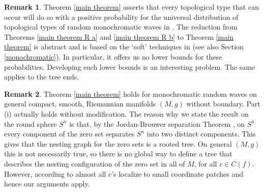 \documentclass[11pt,reqno]{amsart}
\theoremstyle{definition}
\newtheorem{remark}{Remark}
\begin{document}
\begin{remark} Theorem \ref{main theorem} asserts that every topological type that can occur will do so with a positive probability for the universal distribution of topological types of random monochromatic waves in \cite{SW}. The reduction from Theorems \ref{main theorem R a} and \ref{main theorem R b}  to  Theorem \ref{main theorem} is abstract and is based on the `soft' techniques in \cite{NS, SW} (see also Section \ref{monochromatic}). In particular, it offers us no lower bounds for these probabilities. Developing such lower bounds is an interesting problem. The same applies to the tree ends.
\end{remark}


\begin{remark}
Theorem \ref{main theorem} holds for monochromatic random waves on general compact, smooth, Riemannian manifolds $(M,g)$ without boundary.  Part (i) actually holds without modification. The reason why we state the result on the round sphere $S^n$ is that, by the Jordan-Brouwer separation Theorem \cite{Li}, on $S^n$ every component of the zero set separates $S^n$ into two distinct components. This gives that the nesting graph for the zero sets is a rooted tree. On general $(M,g)$ this is not necessarily true, so there is no global way to define a tree that describes the nesting configuration of the zero set in all of $M$, for all $c \in C(f)$. However, according to \cite{NS2} almost all $c$'s localize to small coordinate patches and hence our arguments apply.\end{remark}
\end{document}
